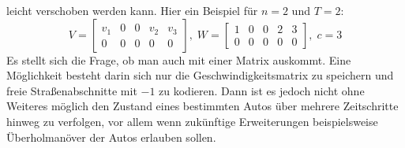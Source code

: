 leicht verschoben werden kann. Hier ein Beispiel für \(n=2\) und \(T=2\):
\[
  V = 
  \begin{bmatrix}
    v_1& 0& 0& v_2& v_3 \\
    0& 0& 0& 0& 0
  \end{bmatrix}, \;
  W = 
  \begin{bmatrix}
    1& 0& 0& 2& 3 \\
    0& 0& 0& 0& 0
  \end{bmatrix}, \;
  c = 3
\]
Es stellt sich die Frage, ob man auch mit einer Matrix auskommt. Eine Möglichkeit besteht darin sich nur die Geschwindigkeitsmatrix 
zu speichern und freie Straßenabschnitte mit \(-1\) zu kodieren. Dann ist es jedoch nicht ohne Weiteres möglich den Zustand eines bestimmten Autos über
mehrere Zeitschritte hinweg zu verfolgen, vor allem wenn zukünftige Erweiterungen beispielsweise Überholmanöver der Autos erlauben sollen.

